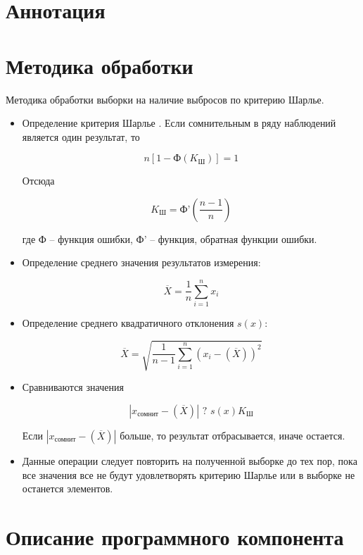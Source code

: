 \documentclass[a4paper,14pt]{article}
\begin{document}


\section{Аннотация}



\section{Методика обработки}

Методика обработки выборки на наличие выбросов по критерию Шарлье.
\begin{itemize}
	\item Определение критерия Шарлье \cite{krSh}. Если сомнительным в ряду наблюдений является один результат, то
	
	$$n[1 - \text{Ф}(K_{\text{Ш}})] = 1$$
	
	Отсюда 
	
	$$K_{\text{Ш}} =  \text{Ф'}(\frac{n-1}{n})$$
	
	где  $\text{Ф}$ -- функция ошибки, $\text{Ф'}$ -- функция, обратная функции ошибки.
	
	\item Определение среднего значения результатов измерения:
	
	$$\overline{X} = \dfrac{1}{n}\sum_{i=1}^{n}x_i$$
	
	\item Определение среднего квадратичного отклонения $s(x)$:
	
	$$\overline{X} = \sqrt{\dfrac{1}{n-1}\sum_{i=1}^{n}(x_i - (\overline X))^2}$$
	
	\item Сравниваются значения \cite{zalaznih}
	
	$$|x_{\text{сомнит}} - (\overline X)| \text{ ? } s(x)K_{\text{Ш}}$$
	
	Если $|x_{\text{сомнит}} - (\overline X)|$ больше, то результат отбрасывается, иначе остается.
	
	\item Данные операции следует повторить на полученной выборке до тех пор, пока все значения все не будут удовлетворять критерию Шарлье или в выборке не останется элементов.
\end{itemize}

\section{Описание программного компонента}
\end{document}
